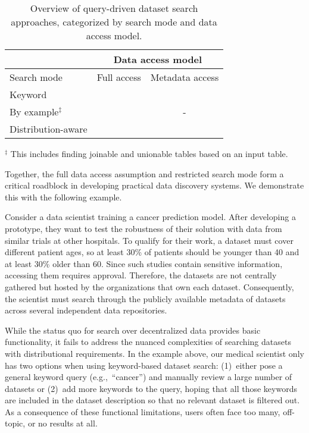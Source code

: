 \begin{table}[t]
    \caption{Overview of query-driven dataset search approaches, categorized by search mode and data access model.}
    \label{tab:solution_space}
    \centering
    \begin{tabularx}{\linewidth}{>{\raggedright\arraybackslash}X c c}
        \toprule
        & \multicolumn{2}{c}{Data access model} \\
        \cmidrule{2-3}
        Search mode & Full access & Metadata access\\
        \midrule
        Keyword & \cite{castelo_auctus_2021, castro_fernandez_aurum_2018} & \cite{noy_google_2019, open_knowledge_foundation_ckan_2022, zhang_ad_2018} \\
        By example$^\ddagger$ & \cite{bharadwaj_discovering_2021, bogatu_dataset_2020, castelo_auctus_2021, castro_fernandez_aurum_2018, rezig_dice_2021, santos_sketch-based_2022} & - \\
        Distribution-aware & \cite{asudeh_towards_2022, chai_selective_2022, nargesian_tailoring_2021} & \system{} \\
        \bottomrule
    \end{tabularx}
    \raggedright\footnotesize
    $^\ddagger$ This includes finding joinable and unionable tables based on an input table.\\
\end{table}

Together, the full data access assumption and restricted search mode form a critical roadblock in developing practical data discovery systems.
We demonstrate this with the following example.

\begin{example}
Consider a data scientist training a cancer prediction model.
After developing a prototype, they want to test the robustness of their solution with data from similar trials at other hospitals.
To qualify for their work, a dataset must cover different patient ages, so at least 30\% of patients should be younger than 40 and at least 30\% older than 60.
Since such studies contain sensitive information, accessing them requires approval.
Therefore, the datasets are not centrally gathered but hosted by the organizations that own each dataset.
Consequently, the scientist must search through the publicly available metadata of datasets across several independent data repositories.
\end{example}

While the status quo for search over decentralized data provides basic functionality, it fails to address the nuanced complexities of searching datasets with distributional requirements.
In the example above, our medical scientist only has two options when using keyword-based dataset search: (1)~either pose a general keyword query (e.g.,~``cancer'') and manually review a large number of datasets or (2)~add more keywords to the query, hoping that all those keywords are included in the dataset description so that no relevant dataset is filtered out.
As a consequence of these functional limitations, users often face too many, off-topic, or no results at all.


